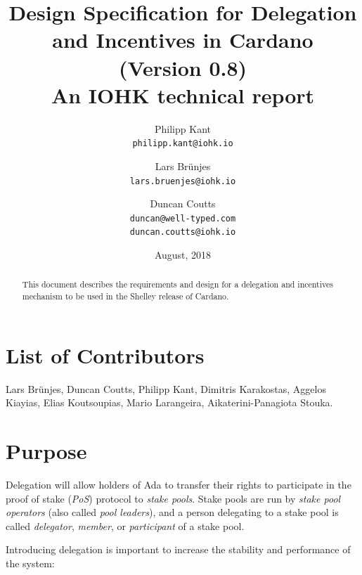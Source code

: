 \documentclass[11pt,a4paper]{article}
\begin{document}
\title{Design Specification for Delegation and Incentives in Cardano \\
       {\small (Version 0.8)} \\
       {\large \sc An IOHK technical report}}

\author{Philipp Kant   \\ {\small \texttt{philipp.kant@iohk.io}} \\
   \and Lars Br\"unjes \\ {\small \texttt{lars.bruenjes@iohk.io}} \\
   \and Duncan Coutts  \\ {\small \texttt{duncan@well-typed.com}} \\
                          {\small \texttt{duncan.coutts@iohk.io}}}
\date{August, 2018}

\maketitle

\begin{abstract}
This document describes the requirements and design for a delegation and
incentives mechanism to be used in the Shelley release of Cardano.
\end{abstract}

\section*{List of Contributors}\label{acknowledgements}

Lars Br\"unjes, Duncan Coutts, Philipp Kant,
Dimitris Karakostas, Aggelos Kiayias, Elias Koutsoupias, Mario
Larangeira, Aikaterini-Panagiota Stouka.

\tableofcontents
\listoffigures
\listoftodos

\section{Purpose}\label{purpose}

Delegation will allow holders of Ada to transfer their rights to
participate in the proof of stake (\emph{PoS}) protocol to \emph{stake
pools}. Stake pools are run by \emph{stake pool operators} (also called
\emph{pool leaders}), and a person delegating to a stake pool is called
\emph{delegator}, \emph{member}, or \emph{participant} of a stake pool.

Introducing delegation is important to increase the stability and
performance of the system:
\end{document}
